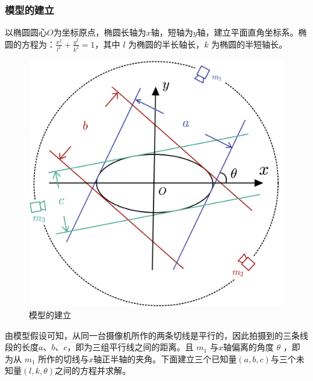 \documentclass[a4paper,10.5pt]{ctexart}
\begin{document}
\subsubsection{模型的建立}
\par 以椭圆圆心$O$为坐标原点，椭圆长轴为$x$轴，短轴为$y$轴，建立平面直角坐标系。椭圆的方程为：$\frac{x^2}{l^2}+\frac{y^2}{k^2}=1$，其中 $l$ 为椭圆的半长轴长，$k$ 为椭圆的半短轴长。
\begin{figure}[h]%
\centering
\includegraphics[scale=0.3]{模型图.png}
\caption{模型的建立}
\label{fig:label}
\end{figure}
\par 由模型假设可知，从同一台摄像机所作的两条切线是平行的，因此拍摄到的三条线段的长度$a$、$b$、$c$，即为三组平行线之间的距离。且 $m_1$ 与$x$轴偏离的角度 $\theta$ ，即为从 $m_1$ 所作的切线与$x$轴正半轴的夹角。下面建立三个已知量$(a,b,c)$与三个未知量$(l,k,\theta)$之间的方程并求解。
\end{document}
